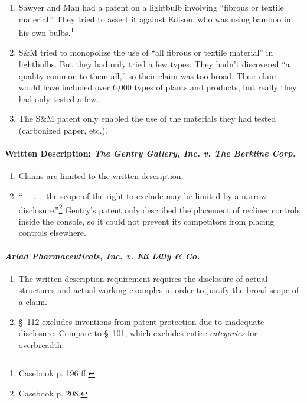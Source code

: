\begin{enumerate}
    \item Sawyer and Man had a patent on a lightbulb involving ``fibrous or 
    textile material.'' They tried to assert it against Edison, who was using 
    bamboo in his own bulbs.\footnote{Casebook p. 196 ff.}
    \item S\&M tried to monopolize the use of ``all fibrous or textile 
    material'' in lightbulbs. But they had only tried a few types. They hadn't 
    discovered ``a quality common to them all,'' so their claim was too broad.  
    Their claim would have included over 6,000 types of plants and products, 
    but really they had only tested a few.
    \item The S\&M patent only enabled the use of the materials they had 
    tested (carbonized paper, etc.).
\end{enumerate}

\paragraph{Written Description: \emph{The Gentry Gallery, Inc. v. 
The Berkline Corp.}}

\begin{enumerate}
    \item Claims are limited to the written description.
    \item ``~.~.~.~the scope of the right to exclude may be limited by a 
    narrow disclosure.''\footnote{Casebook p. 208.} Gentry's patent only 
    described the placement of recliner controls inside the console, so it 
    could not prevent its competitors from placing controls elsewhere.
\end{enumerate}

\paragraph{\emph{Ariad Pharmaceuticals, Inc. v. Eli Lilly \& Co.}} %

\begin{enumerate}
    \item The written description requirement requires the disclosure of 
    actual structures and actual working examples in order to justify the 
    broad scope of a claim.
    \item \S\ 112 excludes inventions from patent protection due to inadequate 
    disclosure. Compare to \S\ 101, which excludes entire \emph{categories} 
    for overbreadth.
\end{enumerate}

